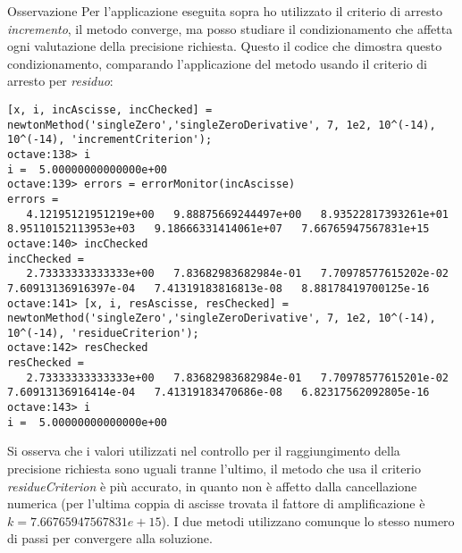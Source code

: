 \begin{paragraph}{Osservazione}
Per l'applicazione eseguita sopra ho utilizzato il criterio di arresto
\emph{incremento}, il metodo converge, ma posso studiare il condizionamento che
affetta ogni valutazione della precisione richiesta. Questo il codice che
dimostra questo condizionamento, comparando l'applicazione del metodo usando il
criterio di arresto per \emph{residuo}:
\begin{lstlisting}
[x, i, incAscisse, incChecked] = newtonMethod('singleZero','singleZeroDerivative', 7, 1e2, 10^(-14), 10^(-14), 'incrementCriterion');
octave:138> i
i =  5.00000000000000e+00
octave:139> errors = errorMonitor(incAscisse)
errors =
   4.12195121951219e+00   9.88875669244497e+00   8.93522817393261e+01   8.95110152113953e+03   9.18666331414061e+07   7.66765947567831e+15
octave:140> incChecked 
incChecked =
   2.73333333333333e+00   7.83682983682984e-01   7.70978577615202e-02   7.60913136916397e-04   7.41319183816813e-08   8.88178419700125e-16
octave:141> [x, i, resAscisse, resChecked] = newtonMethod('singleZero','singleZeroDerivative', 7, 1e2, 10^(-14), 10^(-14), 'residueCriterion');
octave:142> resChecked 
resChecked =
   2.73333333333333e+00   7.83682983682984e-01   7.70978577615201e-02   7.60913136916414e-04   7.41319183470686e-08   6.82317562092805e-16
octave:143> i
i =  5.00000000000000e+00
\end{lstlisting}
Si osserva che i valori utilizzati nel controllo per il raggiungimento della
precisione richiesta sono uguali tranne l'ultimo, il metodo che usa il criterio
\emph{residueCriterion} \`e pi\`u accurato, in quanto non \`e affetto dalla
cancellazione numerica (per l'ultima coppia di ascisse trovata il fattore di
amplificazione \`e $k = 7.66765947567831e+15$). I due metodi utilizzano comunque
lo stesso numero di passi per convergere alla soluzione.
\end{paragraph}

